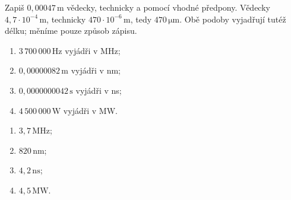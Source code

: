 \documentclass[11pt,a4paper]{article}
\begin{document}
\begin{prikladReseniBox}[breakable=false,title={Příklad 4}]
Zapiš $0{,}00047\,\mathrm m$ vědecky, technicky a pomocí vhodné předpony.
\tcblower
Vědecky $4{,}7\cdot10^{-4}\,\mathrm m$,
technicky $470\cdot10^{-6}\,\mathrm m$,
tedy $\boxed{470\,\mathrm{\mu m}}$.
Obě podoby vyjadřují tutéž délku; měníme pouze způsob zápisu.
\end{prikladReseniBox}

\begin{zadaniReseniBox}[breakable=false,title={Samostatná práce 4}]
\begin{enumerate}[label=\alph*)]
\item $3\,700\,000\,\mathrm{Hz}$ vyjádři v MHz;
\item $0{,}00000082\,\mathrm m$ vyjádři v nm;
\item $0{,}0000000042\,\mathrm s$ vyjádři v ns;
\item $4\,500\,000\,\mathrm W$ vyjádři v MW.
\end{enumerate}
\tcblower
\begin{enumerate}[label=\alph*)]
\item $3{,}7\,\mathrm{MHz}$;
\item $820\,\mathrm{nm}$;
\item $4{,}2\,\mathrm{ns}$;
\item $4{,}5\,\mathrm{MW}$.
\end{enumerate}
\end{zadaniReseniBox}
\end{document}
